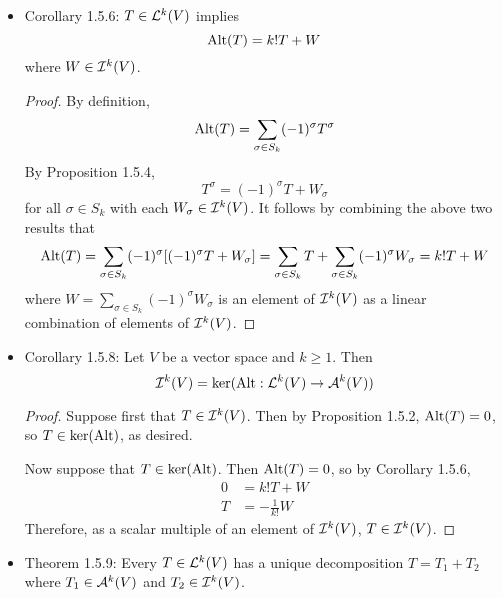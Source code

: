 \documentclass[../notes.tex]{subfiles}
\begin{document}
\begin{itemize}
\begin{proof}
\begin{align*}
        \end{align*}
        where the dots are elements of $\ide[k]{V}$.
    \end{proof}
    \item Corollary 1.5.6: $T\in\lin[k]{V}$ implies
    \begin{equation*}
        \Alt(T) = k!T+W
    \end{equation*}
    where $W\in\ide[k]{V}$.
    \begin{proof}
        By definition,
        \begin{equation*}
            \Alt(T) = \sum_{\sigma\in S_k}(-1)^\sigma T^\sigma
        \end{equation*}
        By Proposition 1.5.4,
        \begin{equation*}
            T^\sigma = (-1)^\sigma T+W_\sigma
        \end{equation*}
        for all $\sigma\in S_k$ with each $W_\sigma\in\ide[k]{V}$. It follows by combining the above two results that
        \begin{equation*}
            \Alt(T) = \sum_{\sigma\in S_k}(-1)^\sigma[(-1)^\sigma T+W_\sigma]
            = \sum_{\sigma\in S_k}T+\sum_{\sigma\in S_k}(-1)^\sigma W_\sigma
            = k!T+W
        \end{equation*}
        where $W=\sum_{\sigma\in S_k}(-1)^\sigma W_\sigma$ is an element of $\ide[k]{V}$ as a linear combination of elements of $\ide[k]{V}$.
    \end{proof}
    \item Corollary 1.5.8: Let $V$ be a vector space and $k\geq 1$. Then
    \begin{equation*}
        \ide[k]{V} = \ker(\Alt:\lin[k]{V}\to\alt[k]{V})
    \end{equation*}
    \begin{proof}
        Suppose first that $T\in\ide[k]{V}$. Then by Proposition 1.5.2, $\Alt(T)=0$, so $T\in\ker(\Alt)$, as desired.\par
        Now suppose that $T\in\ker(\Alt)$. Then $\Alt(T)=0$, so by Corollary 1.5.6,
        \begin{align*}
            0 &= k!T+W\\
            T &= -\frac{1}{k!}W
        \end{align*}
        Therefore, as a scalar multiple of an element of $\ide[k]{V}$, $T\in\ide[k]{V}$.
    \end{proof}
    \item Theorem 1.5.9: Every $T\in\lin[k]{V}$ has a unique decomposition $T=T_1+T_2$ where $T_1\in\alt[k]{V}$ and $T_2\in\ide[k]{V}$.

\end{itemize}
\end{document}
